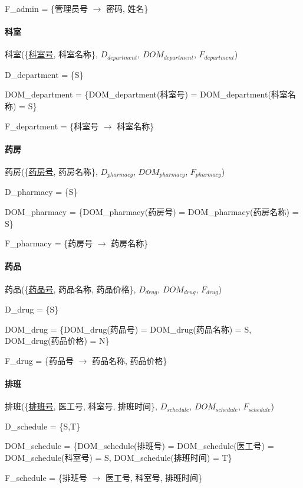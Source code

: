 \documentclass{article}
\begin{document}
F\_admin = \{管理员号 $\rightarrow$ 密码, 姓名\}

\paragraph{科室}

科室(\{\underline{科室号}, 科室名称\}, $D_{department}$, $DOM_{department}$, $F_{department}$)

D\_department = \{S\}

DOM\_department = \{DOM\_department(科室号) = DOM\_department(科室名称) = S\}

F\_department = \{科室号 $\rightarrow$ 科室名称\}

\paragraph{药房}

药房(\{\underline{药房号}, 药房名称\}, $D_{pharmacy}$, $DOM_{pharmacy}$, $F_{pharmacy}$)

D\_pharmacy = \{S\}

DOM\_pharmacy = \{DOM\_pharmacy(药房号) = DOM\_pharmacy(药房名称) = S\}

F\_pharmacy = \{药房号 $\rightarrow$ 药房名称\}

\paragraph{药品}

药品(\{\underline{药品号}, 药品名称,  药品价格\}, $D_{drug}$, $DOM_{drug}$, $F_{drug}$)

D\_drug = \{S\}

DOM\_drug = \{DOM\_drug(药品号) = DOM\_drug(药品名称) = S, DOM\_drug(药品价格) = N\}

F\_drug = \{药品号 $\rightarrow$ 药品名称, 药品价格\}

\paragraph{排班}

排班(\{\underline{排班号}, 医工号, 科室号, 排班时间\}, $D_{schedule}$, $DOM_{schedule}$, $F_{schedule}$)

D\_schedule = \{S,T\}

DOM\_schedule = \{DOM\_schedule(排班号) = DOM\_schedule(医工号) = DOM\_schedule(科室号) = S, DOM\_schedule(排班时间) = T\}

F\_schedule = \{排班号 $\rightarrow$ 医工号, 科室号, 排班时间\}
\end{document}
